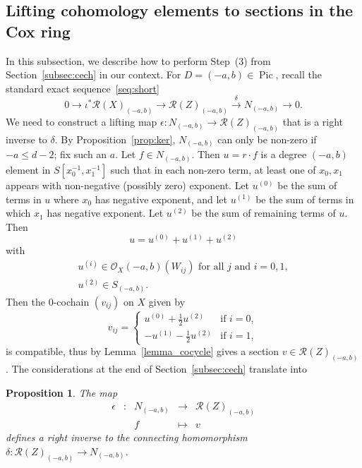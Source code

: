 \documentclass[a4paper,11pt]{amsart}
\theoremstyle{plain}
\newtheorem{proposition}[theorem]{Proposition}
\theoremstyle{definition}
\newcommand{\R}{\mathcal{R}}
\newcommand{\Ox}{\mathcal{O}}
\DeclareMathOperator{\Pic}{Pic}
\begin{document}
\subsection{Lifting cohomology elements to sections in the Cox ring} \label{sec:lifting} In this subsection, we describe how to perform Step~(3) from Section~\ref{subsec:cech} in our context. For $D=(-a,b)\in\Pic$, recall the standard exact sequence~\eqref{seq:short}
\[
0\longrightarrow \iota^*\R(X)_{(-a,b)}\stackrel{}\longrightarrow \R(Z)_{(-a,b)} \stackrel{\delta}\longrightarrow N_{(-a,b)}\longrightarrow 0.
\]
We need to construct a lifting map $\epsilon\colon N_{(-a,b)} \rightarrow \R(Z)_{(-a,b)}$ that is a right inverse to $\delta$. By Proposition~\ref{prop:ker}, $N_{(-a,b)}$ can only be non-zero if $-a \leq d-2$; fix such an $a$. Let $f \in N_{(-a,b)}$. Then $u = r \cdot f$ is a degree $(-a,b)$ element in $S[x_0^{-1}, x_1^{-1}]$ such that in each non-zero term, at least one of $x_0, x_1$ appears with non-negative (possibly zero) exponent. Let $u^{(0)}$ be the sum of terms in $u$ where $x_0$ has negative exponent, and let $u^{(1)}$ be the sum of terms in which $x_1$ has negative exponent. Let $u^{(2)}$ be the sum of remaining terms of $u$. Then 
\begin{equation} \label{eq:split}
u  = u^{(0)}+u^{(1)}+u^{(2)}
\end{equation}
with
\[ \begin{array}{c}
    u^{(i)} \in \Ox_X(-a,b)(W_{ij})  \mbox{ for all } j \mbox{ and } i = 0,1, \\
    u^{(2)} \in S_{(-a,b)}.
\end{array}
\]
Then the $0$-cochain $(v_{ij})$ on $X$ given by 
\begin{equation}\label{eq_nonuniquelift}
v_{ij} =
 \left\{
  \begin{array}{ll}
			 u^{(0)} + \frac{1}{2} u^{(2)} & \mbox{if } i = 0, \\
			 -u^{(1)} - \frac{1}{2} u^{(2)} & \mbox{if } i = 1, 
		\end{array}
		\right.
\end{equation}
is compatible, thus by Lemma~\ref{lemma_cocycle} gives a section $v \in \R(Z)_{(-a,b)}$. The considerations at the end of Section~\ref{subsec:cech} translate into 
\begin{proposition} \label{prop:epsilon}
    The map 
\[\begin{array}{rcccl} \epsilon& \colon &  N_{(-a,b)} & \to & \R(Z)_{(-a,b)}\\
&& f & \mapsto & v
\end{array}
\]
defines a right inverse to the connecting homomorphism $\delta\colon \R(Z)_{(-a,b)} \to N_{(-a,b)}$.
\end{proposition}
\end{document}
